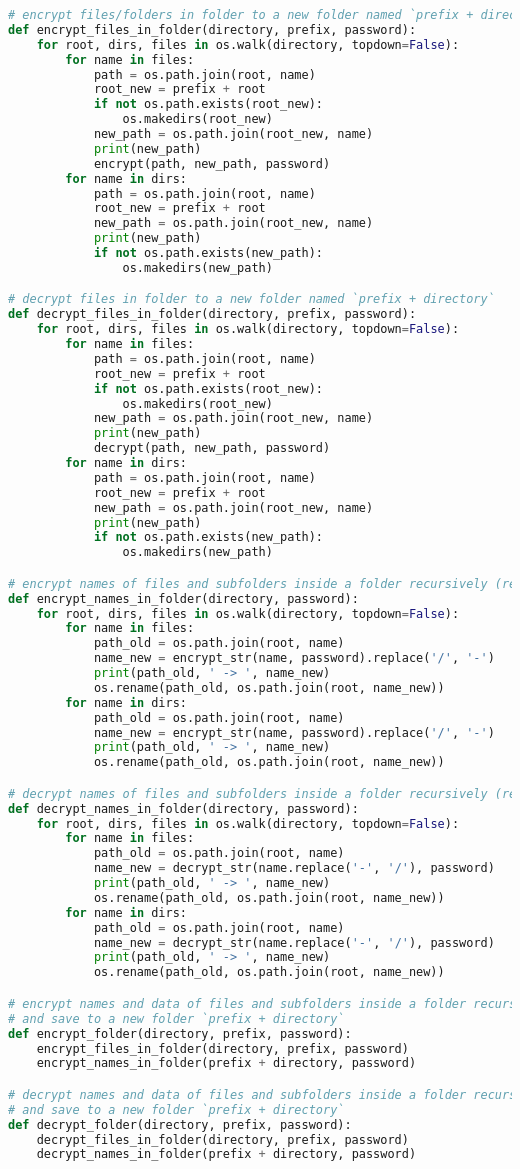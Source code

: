 \begin{lstlisting}[language=python,caption=encrypt.py]
# encrypt files/folders in folder to a new folder named `prefix + directory`
def encrypt_files_in_folder(directory, prefix, password):
	for root, dirs, files in os.walk(directory, topdown=False):
		for name in files:
			path = os.path.join(root, name)
			root_new = prefix + root
			if not os.path.exists(root_new):
				os.makedirs(root_new)
			new_path = os.path.join(root_new, name)
			print(new_path)
			encrypt(path, new_path, password)
		for name in dirs:
			path = os.path.join(root, name)
			root_new = prefix + root
			new_path = os.path.join(root_new, name)
			print(new_path)
			if not os.path.exists(new_path):
				os.makedirs(new_path)

# decrypt files in folder to a new folder named `prefix + directory`
def decrypt_files_in_folder(directory, prefix, password):
	for root, dirs, files in os.walk(directory, topdown=False):
		for name in files:
			path = os.path.join(root, name)
			root_new = prefix + root
			if not os.path.exists(root_new):
				os.makedirs(root_new)
			new_path = os.path.join(root_new, name)
			print(new_path)
			decrypt(path, new_path, password)
		for name in dirs:
			path = os.path.join(root, name)
			root_new = prefix + root
			new_path = os.path.join(root_new, name)
			print(new_path)
			if not os.path.exists(new_path):
				os.makedirs(new_path)

# encrypt names of files and subfolders inside a folder recursively (rename)
def encrypt_names_in_folder(directory, password):
	for root, dirs, files in os.walk(directory, topdown=False):
		for name in files:
			path_old = os.path.join(root, name)
			name_new = encrypt_str(name, password).replace('/', '-')
			print(path_old, ' -> ', name_new)
			os.rename(path_old, os.path.join(root, name_new))
		for name in dirs:
			path_old = os.path.join(root, name)
			name_new = encrypt_str(name, password).replace('/', '-')
			print(path_old, ' -> ', name_new)
			os.rename(path_old, os.path.join(root, name_new))

# decrypt names of files and subfolders inside a folder recursively (rename)
def decrypt_names_in_folder(directory, password):
	for root, dirs, files in os.walk(directory, topdown=False):
		for name in files:
			path_old = os.path.join(root, name)
			name_new = decrypt_str(name.replace('-', '/'), password)
			print(path_old, ' -> ', name_new)
			os.rename(path_old, os.path.join(root, name_new))
		for name in dirs:
			path_old = os.path.join(root, name)
			name_new = decrypt_str(name.replace('-', '/'), password)
			print(path_old, ' -> ', name_new)
			os.rename(path_old, os.path.join(root, name_new))

# encrypt names and data of files and subfolders inside a folder recursively
# and save to a new folder `prefix + directory`
def encrypt_folder(directory, prefix, password):
	encrypt_files_in_folder(directory, prefix, password)
	encrypt_names_in_folder(prefix + directory, password)

# decrypt names and data of files and subfolders inside a folder recursively
# and save to a new folder `prefix + directory`
def decrypt_folder(directory, prefix, password):
	decrypt_files_in_folder(directory, prefix, password)
	decrypt_names_in_folder(prefix + directory, password)
\end{lstlisting}
